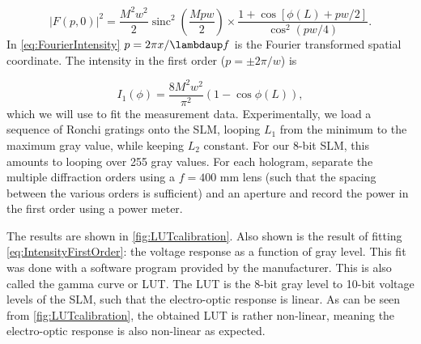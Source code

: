 \begin{equation}\label{eq:FourierIntensity}
    |F(p,0)|^2=
    \frac{M^2 w^2}{2}\operatorname{sinc}^2\left(\frac{M p w}{2}\right) \times
    \frac{1 + \cos{\left[\phi(L)+p w/2\right]}}{\cos^2(p w/4)}.
\end{equation}
In \cref{eq:FourierIntensity} $p=2\pi x/\lambdaup f$ is the Fourier transformed spatial coordinate. The intensity in the first order ($p=\pm 2\pi/w$) is

\begin{equation}\label{eq:IntensityFirstOrder}
    I_1(\phi) =
    \frac{8M^2w^2}{\pi^2} \left( 
    1-\cos{\phi(L)}
    \right),
\end{equation}
which we will use to fit the measurement data. Experimentally, we load a sequence of Ronchi gratings onto the SLM, looping $L_1$ from the minimum to the maximum gray value, while keeping $L_2$ constant. 
For our 8-bit SLM, this amounts to looping over 255 gray values.
For each hologram, separate the multiple diffraction orders using a $f=400$ mm lens (such that the spacing between the various orders is sufficient) and an aperture and record the power in the first order using a power meter.

The results are shown in \cref{fig:LUTcalibration}. 
Also shown is the result of fitting \cref{eq:IntensityFirstOrder}: the voltage response as a function of gray level. 
This fit was done with a software program provided by the manufacturer.
This is also called the gamma curve or \ac{LUT}.
The LUT is the 8-bit gray level to 10-bit voltage levels of the SLM, such that the electro-optic response is linear. 
As can be seen from \cref{fig:LUTcalibration}, the obtained LUT is rather non-linear, meaning the electro-optic response is also non-linear as expected.

